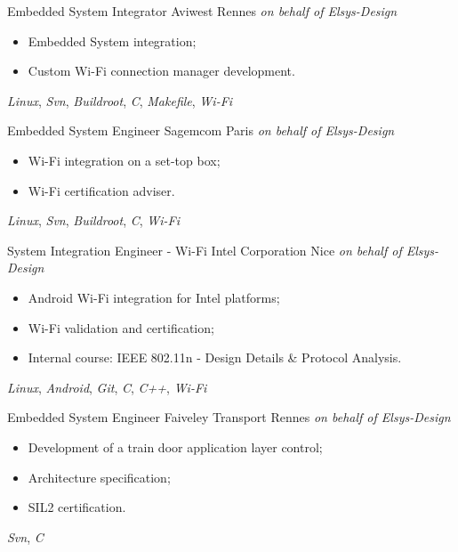 \documentclass[11pt,a4paper,sans]{moderncv}
\begin{document}
	{Embedded System Integrator}
	{Aviwest}
	{Rennes}
	{\textit{on behalf of Elsys-Design}}
	{
		\begin{itemize}
		\item Embedded System integration;
		\item Custom Wi-Fi connection manager development.
		\end{itemize}
		\textit{Linux},
		\textit{Svn},
		\textit{Buildroot},
		\textit{C}, \textit{Makefile},
		\textit{Wi-Fi}
	}
	{Embedded System Engineer}
	{Sagemcom}
	{Paris}
	{\textit{on behalf of Elsys-Design}}
	{
		\begin{itemize}
		\item Wi-Fi integration on a set-top box;
		\item Wi-Fi certification adviser.
		\end{itemize}
		\textit{Linux},
		\textit{Svn},
		\textit{Buildroot},
		\textit{C},
		\textit{Wi-Fi}
	}
	{System Integration Engineer - Wi-Fi}
	{Intel Corporation}
	{Nice}
	{\textit{on behalf of Elsys-Design}}
	{
		\begin{itemize}
		\item Android Wi-Fi integration for Intel platforms;
		\item Wi-Fi validation and certification;
		\item Internal course: IEEE 802.11n
			- Design Details \& Protocol Analysis.
		\end{itemize}
		\textit{Linux}, \textit{Android},
		\textit{Git},
		\textit{C}, \textit{C++},
		\textit{Wi-Fi}
	}
	{Embedded System Engineer}
	{Faiveley Transport}
	{Rennes}
	{\textit{on behalf of Elsys-Design}}
	{
		\begin{itemize}
		\item Development of a train door application layer control;
		\item Architecture specification;
		\item SIL2 certification.
		\end{itemize}
		\textit{Svn},
		\textit{C}
	}
\end{document}
